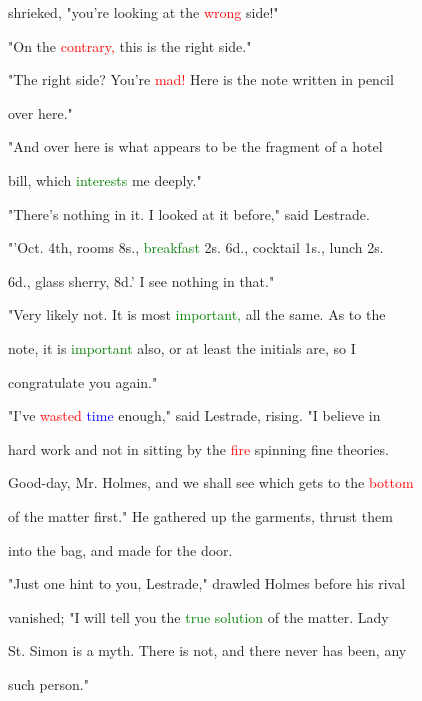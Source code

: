  \textcolor{BurntOrange}{shrieked,} "you're looking at the \textcolor{red}{wrong} side!"



 "On the \textcolor{red}{contrary,} this is the right side."



 "The right side? You're \textcolor{red}{mad!} Here is the note written in pencil

 over here."



 "And over here is what appears to be the fragment of a hotel

 bill, which \textcolor{green}{interests} me deeply."



 "There's nothing in it. I looked at it before," said Lestrade.

 "'Oct. 4th, rooms 8s., \textcolor{green}{breakfast} 2s. 6d., cocktail 1s., lunch 2s.

 6d., glass sherry, 8d.' I see nothing in that."



 "Very likely not. It is most \textcolor{green}{important,} all the same. As to the

 note, it is \textcolor{green}{important} also, or at least the initials are, so I

 congratulate you again."



 "I've \textcolor{red}{wasted} \textcolor{blue}{time} enough," said Lestrade, rising. "I believe in

 hard work and not in sitting by the \textcolor{red}{fire} spinning fine \textcolor{BurntOrange}{theories.}

 Good-day, Mr. Holmes, and we shall see which gets to the \textcolor{red}{bottom}

 of the matter first." He gathered up the garments, thrust them

 into the bag, and made for the door.



 "Just one hint to you, Lestrade," drawled Holmes before his rival

 \textcolor{BurntOrange}{vanished;} "I will tell you the \textcolor{green}{true} \textcolor{green}{solution} of the matter. Lady

 St. Simon is a myth. There is not, and there never has been, any

 such person."



